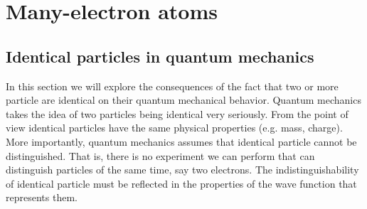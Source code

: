 \documentclass[../Main/chem331-notes.tex]{subfiles}
\begin{document}
\setcounter{section}{13}

\section{Many-electron atoms}
\subsection{Identical particles in quantum mechanics}
In this section we will explore the consequences of the fact that two or more particle are identical on their quantum mechanical behavior. Quantum mechanics takes the idea of two particles being identical very seriously.
From the point of view identical particles have the same physical properties (e.g. mass, charge). More importantly, quantum mechanics assumes that identical particle cannot be distinguished.
That is, there is no experiment we can perform that can distinguish particles of the same time, say two electrons.
The indistinguishability of identical particle must be reflected in the properties of the wave function that represents them.
\end{document}
